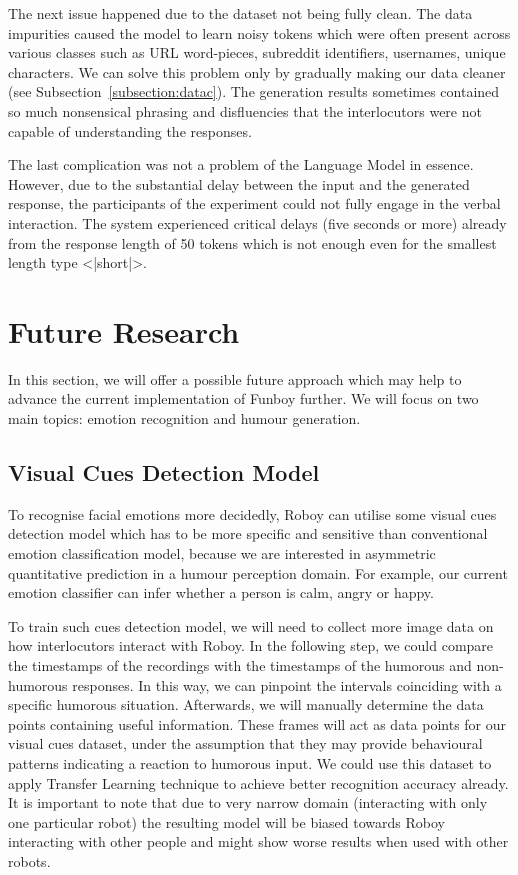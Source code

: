 The next issue happened due to the dataset not being fully clean. The data impurities caused the model to learn noisy tokens which were often present across various classes such as URL word-pieces, subreddit identifiers, usernames, unique characters. We can solve this problem only by gradually making our data cleaner (see Subsection~\ref{subsection:datac}). The generation results sometimes contained so much nonsensical phrasing and disfluencies that the interlocutors were not capable of understanding the responses.
        
The last complication was not a problem of the Language Model in essence. However, due to the substantial delay between the input and the generated response, the participants of the experiment could not fully engage in the verbal interaction. The system experienced critical delays (five seconds or more) already from the response length of 50 tokens which is not enough even for the smallest length type <|short|>.


\section{Future Research}

In this section, we will offer a possible future approach which may help to advance the current implementation of Funboy further. We will focus on two main topics: emotion recognition and humour generation.

\subsection{Visual Cues Detection Model}
To recognise facial emotions more decidedly, Roboy can utilise some visual cues detection model which has to be more specific and sensitive than conventional emotion classification model, because we are interested in asymmetric quantitative prediction in a humour perception domain. For example, our current emotion classifier can infer whether a person is calm, angry or happy. 

To train such cues detection model, we will need to collect more image data on how interlocutors interact with Roboy. In the following step, we could compare the timestamps of the recordings with the timestamps of the humorous and non-humorous responses. In this way, we can pinpoint the intervals coinciding with a specific humorous situation. Afterwards, we will manually determine the data points containing useful information. These frames will act as data points for our visual cues dataset, under the assumption that they may provide behavioural patterns indicating a reaction to humorous input. We could use this dataset to apply Transfer Learning technique to achieve better recognition accuracy already. It is important to note that due to very narrow domain (interacting with only one particular robot) the resulting model will be biased towards Roboy interacting with other people and might show worse results when used with other robots.

